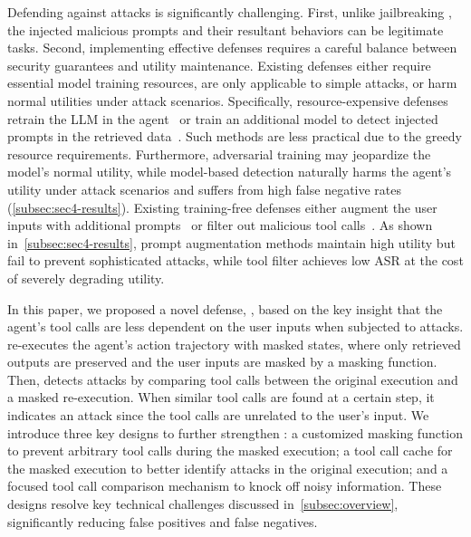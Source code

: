 Defending against \ipi attacks is significantly challenging.
First, unlike jailbreaking \llm, the injected malicious prompts and their resultant behaviors can be legitimate tasks.
Second, implementing effective defenses requires a careful balance between security guarantees and utility maintenance. 
Existing \ipi defenses either require essential model training resources, are only applicable to simple attacks, or harm normal utilities under attack scenarios.
Specifically, resource-expensive defenses retrain the LLM in the agent~\cite{chen2024struq, wallace2024instruction} or train an additional model to detect injected prompts in the retrieved data~\cite{deberta-v3-base-prompt-injection-v2}. 
Such methods are less practical due to the greedy resource requirements. 
Furthermore, adversarial training may jeopardize the model's normal utility, while model-based detection naturally harms the agent's utility under attack scenarios and suffers from high false negative rates (\cref{subsec:sec4-results}).
Existing training-free defenses either augment the user inputs with additional prompts~\cite{alex2023ultimate, hines2024defending, learning_prompt_sandwich_url} or filter out malicious tool calls~\cite{debenedetti2024agentdojo}.
As shown in~\cref{subsec:sec4-results}, prompt augmentation methods maintain high utility but fail to prevent sophisticated attacks, while tool filter achieves low ASR at the cost of severely degrading utility. 

In this paper, we proposed a novel \ipi defense, \method, based on the key insight that the agent's tool calls are less dependent on the user inputs when subjected to attacks.
\method re-executes the agent's action trajectory with masked states, where only retrieved outputs are preserved and the user inputs are masked by a masking function. 
Then, \method detects attacks by comparing tool calls between the original execution and a masked re-execution.
When similar tool calls are found at a certain step, it indicates an attack since the tool calls are unrelated to the user's input.
We introduce three key designs to further strengthen \method: a customized masking function to prevent arbitrary tool calls during the masked execution; a tool call cache for the masked execution to better identify attacks in the original execution; and a focused tool call comparison mechanism to knock off noisy information.
These designs resolve key technical challenges discussed in~\cref{subsec:overview}, significantly reducing false positives and false negatives.   

